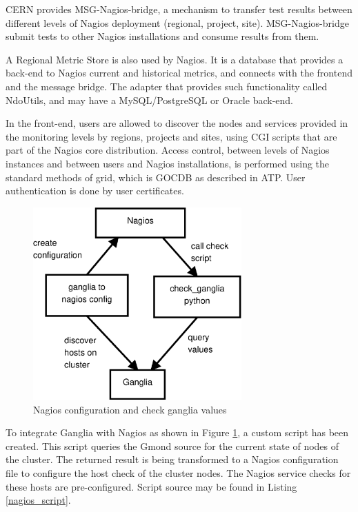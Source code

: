 CERN provides MSG-Nagios-bridge, a mechanism to transfer test results between different levels of Nagios deployment (regional, project, site). MSG-Nagios-bridge submit tests to other Nagios installations and consume results from them. 

A Regional Metric Store is also used by Nagios. It is a database that provides a back-end to Nagios current and historical metrics, and connects with the frontend and the message bridge. The adapter that provides such functionality called NdoUtils, and may have a MySQL/PostgreSQL or Oracle back-end.

In the front-end, users are allowed to discover the nodes and services provided in the monitoring levels by regions, projects and sites, using \ac{CGI} scripts that are part of the Nagios core distribution. Access control, between levels of Nagios instances and between users and Nagios installations, is performed using the standard methods of grid, which is \ac{GOCDB} as described in \ac{ATP}. User authentication is done by user certificates.

\begin{figure}[htb]
\centering
 \includegraphics[width=80mm]{images/nagios_check_ganglia.eps}
\caption{Nagios configuration and check ganglia values}
\label{figure:nagios_ganglia}
\end{figure}

To integrate Ganglia with Nagios as shown in Figure \ref{figure:nagios_ganglia}, a custom script has been created. This script queries the Gmond source for the current state of nodes of the cluster. The returned result is being transformed to a Nagios configuration file to configure the host check of the cluster nodes. The Nagios service checks for these hosts are pre-configured. Script source may be found in Listing \ref{nagios_script}.

